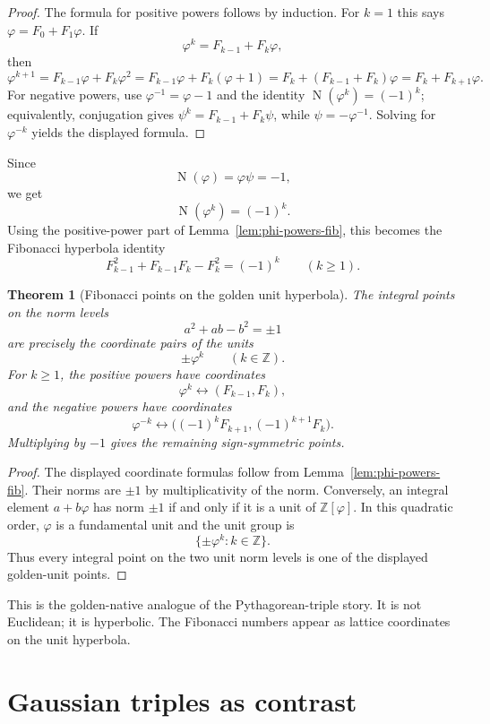 \documentclass[11pt]{article}
\newtheorem{theorem}[definition]{Theorem}
\newcommand{\Nm}{\operatorname{N}}
\newcommand{\ph}{\varphi}
\newcommand{\ps}{\psi}
\newcommand{\Z}{\mathbb{Z}}
\begin{document}
\begin{proof}
The formula for positive powers follows by induction.  For $k=1$ this says $\ph=F_0+F_1\ph$.  If
\[
    \ph^k=F_{k-1}+F_k\ph,
\]
then
\[
    \ph^{k+1}=F_{k-1}\ph+F_k\ph^2
    =F_{k-1}\ph+F_k(\ph+1)
    =F_k+(F_{k-1}+F_k)\ph
    =F_k+F_{k+1}\ph.
\]
For negative powers, use $\ph^{-1}=\ph-1$ and the identity $\Nm(\ph^k)=(-1)^k$; equivalently, conjugation gives $\ps^k=F_{k-1}+F_k\ps$, while $\ps=-\ph^{-1}$.  Solving for $\ph^{-k}$ yields the displayed formula.
\end{proof}

Since
\[
    \Nm(\ph)=\ph\ps=-1,
\]
we get
\[
    \Nm(\ph^k)=(-1)^k.
\]
Using the positive-power part of Lemma~\ref{lem:phi-powers-fib}, this becomes the Fibonacci hyperbola identity
\[
    F_{k-1}^2+F_{k-1}F_k-F_k^2=(-1)^k
    \qquad(k\ge1).
\]

\begin{theorem}[Fibonacci points on the golden unit hyperbola]\label{thm:fibonacci-hyperbola}
The integral points on the norm levels
\[
    a^2+ab-b^2=\pm1
\]
are precisely the coordinate pairs of the units
\[
    \pm\ph^k\qquad(k\in\Z).
\]
For $k\ge1$, the positive powers have coordinates
\[
    \ph^k \leftrightarrow (F_{k-1},F_k),
\]
and the negative powers have coordinates
\[
    \ph^{-k} \leftrightarrow \bigl((-1)^kF_{k+1},(-1)^{k+1}F_k\bigr).
\]
Multiplying by $-1$ gives the remaining sign-symmetric points.
\end{theorem}

\begin{proof}
The displayed coordinate formulas follow from Lemma~\ref{lem:phi-powers-fib}.  Their norms are $\pm1$ by multiplicativity of the norm.  Conversely, an integral element $a+b\ph$ has norm $\pm1$ if and only if it is a unit of $\Z[\ph]$.  In this quadratic order, $\ph$ is a fundamental unit and the unit group is
\[
    \{\pm\ph^k:k\in\Z\}.
\]
Thus every integral point on the two unit norm levels is one of the displayed golden-unit points.
\end{proof}

This is the golden-native analogue of the Pythagorean-triple story.  It is not Euclidean; it is hyperbolic.  The Fibonacci numbers appear as lattice coordinates on the unit hyperbola.

\section{Gaussian triples as contrast}
\end{document}
